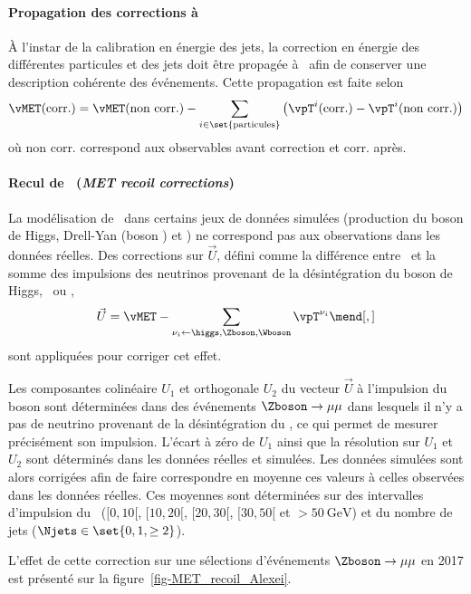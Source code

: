 \paragraph{Propagation des corrections à \MET}
À l'instar de la calibration en énergie des jets,
la correction en énergie des différentes particules et des jets doit être propagée à \MET\ afin de conserver une description cohérente des événements.
Cette propagation est faite selon
\begin{equation}
\vMET(\text{corr.}) = \vMET(\text{non corr.}) - \sum_{i\in\set{\text{particules}}} \left( \vpT^i(\text{corr.}) - \vpT^i(\text{non corr.}) \right)
\end{equation}
où
\og non corr. \fg{} correspond aux observables avant correction
et
\og corr. \fg{} après.
\paragraph{Recul de \MET\ (\emph{MET recoil corrections})}
La modélisation de \MET\ dans certains jeux de données simulées (production du boson de Higgs, Drell-Yan (boson \Zboson) et \Wjets) ne correspond pas aux observations dans les données réelles.
Des corrections sur $\vec{U}$, défini comme la différence entre \MET\ et la somme des impulsions des neutrinos provenant de la désintégration du boson de Higgs, \Zboson\ ou \Wboson, \ie
\begin{equation}
\vec{U} = \vMET - \sum_{\nu_i \leftarrow \higgs,\Zboson,\Wboson} \vpT^{\nu_i}
\mend[,]
\end{equation}
sont appliquées pour corriger cet effet.
\par
Les composantes colinéaire $U_1$ et orthogonale $U_2$ du vecteur $\vec{U}$ à l'impulsion du boson sont déterminées dans des événements $\Zboson\to\mu\mu$ dans lesquels il n'y a pas de neutrino provenant de la désintégration du \Zboson, ce qui permet de mesurer précisément son impulsion.
L'écart à zéro de $U_1$ ainsi que la résolution sur $U_1$ et $U_2$ sont déterminés dans les données réelles et simulées.
Les données simulées sont alors corrigées afin de faire correspondre en moyenne ces valeurs à celles observées dans les données réelles.
Ces moyennes sont déterminées sur des intervalles d'impulsion du \Zboson\ ($[\num{0}, \num{10}[$, $[\num{10}, \num{20}[$, $[\num{20}, \num{30}[$, $[\num{30}, \num{50}[$ et $>\SI{50}{\GeV}$) et du nombre de jets ($\Njets\in\set{0, 1, \geq2}$).
\par
L'effet de cette correction sur une sélections d'événements $\Zboson\to\mu\mu$ en 2017 est présenté sur la figure~\ref{fig-MET_recoil_Alexei}.
